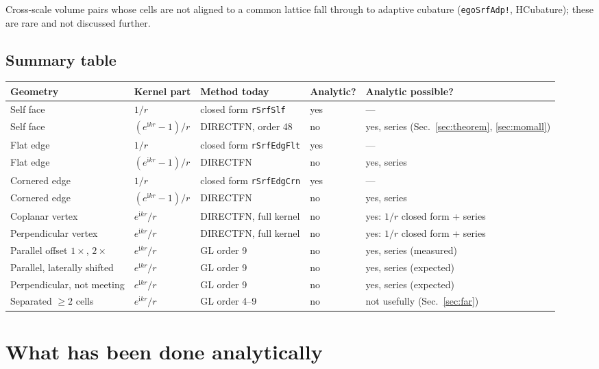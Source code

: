 \documentclass[11pt]{article}
\theoremstyle{remark}
\newcommand{\ii}{\mathrm{i}}
\newcommand{\code}[1]{\texttt{#1}}
\begin{document}
Cross-scale volume pairs whose cells are not aligned to a common lattice fall
through to adaptive cubature (\code{egoSrfAdp!}, HCubature); these are rare and not
discussed further.

\subsection{Summary table}

\begin{center}
\footnotesize
\begin{tabular}{@{}lllll@{}}
\toprule
Geometry & Kernel part & Method today & Analytic? & Analytic possible? \\
\midrule
Self face & $1/r$ & closed form \code{rSrfSlf} & yes & --- \\
Self face & $(e^{\ii kr}-1)/r$ & DIRECTFN, order 48 & no & yes, series (Sec.~\ref{sec:theorem}, \ref{sec:momall}) \\
Flat edge & $1/r$ & closed form \code{rSrfEdgFlt} & yes & --- \\
Flat edge & $(e^{\ii kr}-1)/r$ & DIRECTFN & no & yes, series \\
Cornered edge & $1/r$ & closed form \code{rSrfEdgCrn} & yes & --- \\
Cornered edge & $(e^{\ii kr}-1)/r$ & DIRECTFN & no & yes, series \\
Coplanar vertex & $e^{\ii kr}/r$ & DIRECTFN, full kernel & no & yes: $1/r$ closed form + series \\
Perpendicular vertex & $e^{\ii kr}/r$ & DIRECTFN, full kernel & no & yes: $1/r$ closed form + series \\
Parallel offset $1\times$, $2\times$ & $e^{\ii kr}/r$ & GL order 9 & no & yes, series (measured) \\
Parallel, laterally shifted & $e^{\ii kr}/r$ & GL order 9 & no & yes, series (expected) \\
Perpendicular, not meeting & $e^{\ii kr}/r$ & GL order 9 & no & yes, series (expected) \\
Separated $\ge 2$ cells & $e^{\ii kr}/r$ & GL order 4--9 & no & not usefully (Sec.~\ref{sec:far}) \\
\bottomrule
\end{tabular}
\end{center}

\section{What has been done analytically}
\label{sec:done}
\end{document}
